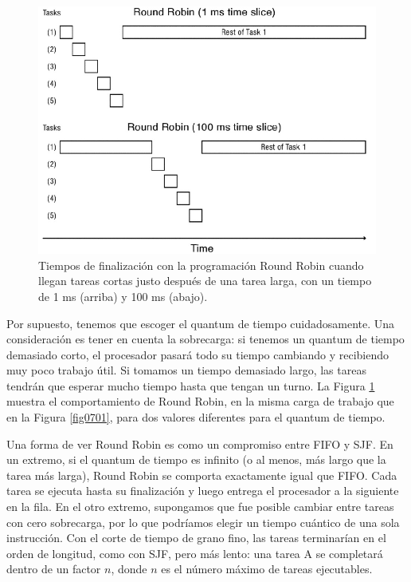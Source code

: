 \documentclass[10pt]{book}
\begin{document}
\begin{figure}[tbhp]
\centerline{\includegraphics[scale=0.70]{img/fig0702}}
\caption{Tiempos de finalización con la programación Round Robin cuando llegan tareas cortas justo después de una tarea larga, con un tiempo de 1 ms (arriba) y 100 ms (abajo).}
\label{fig0702}
\end{figure}

Por supuesto, tenemos que escoger el quantum de tiempo cuidadosamente. Una consideración es tener en cuenta la sobrecarga: si tenemos un quantum de tiempo demasiado corto, el procesador pasará todo su tiempo cambiando y recibiendo muy poco trabajo útil. Si tomamos un tiempo demasiado largo, las tareas tendrán que esperar mucho tiempo hasta que tengan un turno. La Figura \ref{fig0702} muestra el comportamiento de Round Robin, en la misma carga de trabajo que en la Figura \ref{fig0701}, para dos valores diferentes para el quantum de tiempo.

Una forma de ver Round Robin es como un compromiso entre FIFO y SJF. En un extremo, si el quantum de tiempo es infinito (o al menos, más largo que la tarea más larga), Round Robin se comporta exactamente igual que FIFO. Cada tarea se ejecuta hasta su finalización y luego entrega el procesador a la siguiente en la fila. En el otro extremo, supongamos que fue posible cambiar entre tareas con cero sobrecarga, por lo que podríamos elegir un tiempo cuántico de una sola instrucción. Con el corte de tiempo de grano fino, las tareas terminarían en el orden de longitud, como con SJF, pero más lento: una tarea A se completará dentro de un factor $n$, donde $n$ es el número máximo de tareas ejecutables.
\end{document}
